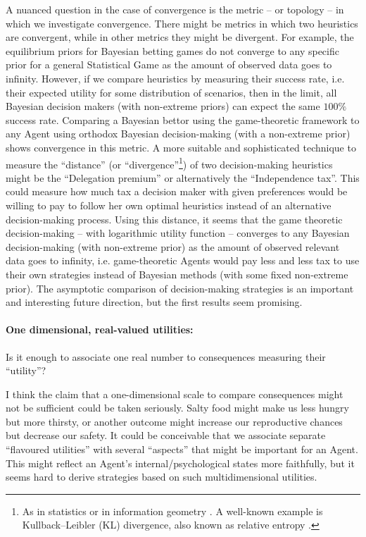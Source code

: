 \documentclass{article}
\begin{document}
A nuanced question in the case of convergence is the metric -- or topology -- in which we investigate convergence. There might be metrics in which two heuristics are convergent, while in other metrics they might be divergent. 
For example, the equilibrium priors for Bayesian betting games do not converge to any specific prior for a general Statistical Game as the amount of observed data goes to infinity. However, if we compare heuristics by measuring their success rate, i.e. their expected utility for some distribution of scenarios, then in the limit, all Bayesian decision makers (with non-extreme priors) can expect the same $100\%$ success rate. Comparing a Bayesian bettor using the game-theoretic framework to any Agent using orthodox Bayesian decision-making (with a non-extreme prior) shows convergence in this metric.
A more suitable and sophisticated technique to measure the ``distance'' (or ``divergence''\footnote{As in statistics or in information geometry \cite{book:AmariInformationGeometry}. A well-known example is Kullback–Leibler (KL) divergence, also known as relative entropy \cite{paper:InformationGeometry,book:AmariInformationGeometry,paper:KullbackLeibler1951}.}) of two decision-making heuristics might be the ``Delegation premium'' or alternatively the ``Independence tax''. This could measure how much tax a decision maker with given preferences would be willing to pay to follow her own optimal heuristics instead of an alternative decision-making process. 
Using this distance, it seems that the game theoretic decision-making -- with logarithmic utility function -- converges to any Bayesian decision-making (with non-extreme prior) as the amount of observed relevant data goes to infinity, i.e. game-theoretic Agents would pay less and less tax to use their own strategies instead of Bayesian methods (with some fixed non-extreme prior).
The asymptotic comparison of decision-making strategies is an important and interesting future direction, but the first results seem promising.


\paragraph{One dimensional, real-valued utilities:}
Is it enough to associate one real number to consequences measuring their ``utility''?

I think the claim that a one-dimensional scale to compare consequences might not be sufficient could be taken seriously. Salty food might make us less hungry but more thirsty, or another outcome might increase our reproductive chances but decrease our safety. It could be conceivable that we associate separate ``flavoured utilities'' with several ``aspects'' that might be important for an Agent.
This might reflect an Agent’s internal/psychological states more faithfully, but it seems hard to derive strategies based on such multidimensional utilities.
\end{document}

